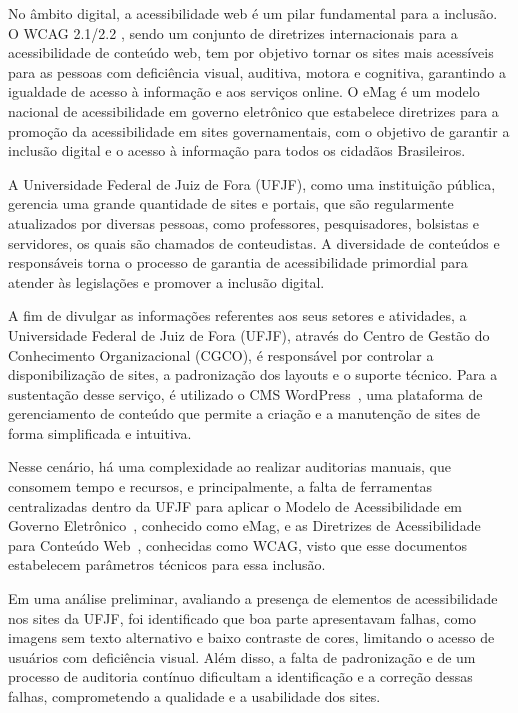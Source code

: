 \documentclass[
    12pt,
    a4paper,
    oneside,
    brazil,
    english
]{article}
\begin{document}
No âmbito digital, a acessibilidade web é um pilar fundamental para a
inclusão. O WCAG 2.1/2.2 \cite{wcag22}, sendo um conjunto de diretrizes
internacionais para a acessibilidade de conteúdo web, tem por objetivo
tornar os sites mais acessíveis para as pessoas com deficiência visual, auditiva,
motora e cognitiva, garantindo a igualdade de acesso à informação e aos
serviços online. O eMag é um modelo nacional de acessibilidade em governo
eletrônico que estabelece diretrizes para a promoção da acessibilidade em
sites governamentais, com o objetivo de garantir a inclusão digital e o acesso
à informação para todos os cidadãos Brasileiros.

A Universidade Federal de Juiz de Fora (UFJF), como uma instituição pública,
gerencia uma grande quantidade de sites e portais, que são regularmente
atualizados por diversas pessoas, como professores, pesquisadores, bolsistas e
servidores, os quais são chamados de conteudistas. A diversidade de conteúdos e
responsáveis torna o processo de garantia de acessibilidade primordial para
atender às legislações e promover a inclusão digital.

A fim de divulgar as informações referentes aos seus setores e atividades, a
Universidade Federal de Juiz de Fora (UFJF), através do Centro de Gestão
do Conhecimento Organizacional (CGCO), é responsável por controlar a
disponibilização de sites, a padronização dos layouts e o suporte técnico. Para
a sustentação desse serviço, é utilizado o CMS WordPress~\cite{WP},
uma plataforma de gerenciamento de conteúdo que permite a criação e a
manutenção de sites de forma simplificada e intuitiva.

Nesse cenário, há uma complexidade ao realizar auditorias manuais, que
consomem tempo e recursos, e principalmente, a falta de ferramentas
centralizadas dentro da UFJF para aplicar o Modelo de Acessibilidade em
Governo Eletrônico~\cite{emag}, conhecido como eMag, e as Diretrizes
de Acessibilidade para Conteúdo Web~\cite{wcag22}, conhecidas como
WCAG, visto que esse documentos estabelecem parâmetros técnicos para essa inclusão.

Em uma análise preliminar, avaliando a presença de elementos de acessibilidade nos
sites da UFJF, foi identificado que boa parte apresentavam falhas, como imagens sem texto
alternativo e baixo contraste de cores, limitando o acesso de usuários com deficiência
visual. Além disso, a falta de padronização e de um processo de auditoria contínuo
dificultam a identificação e a correção dessas falhas, comprometendo a qualidade e a
usabilidade dos sites.
\end{document}
